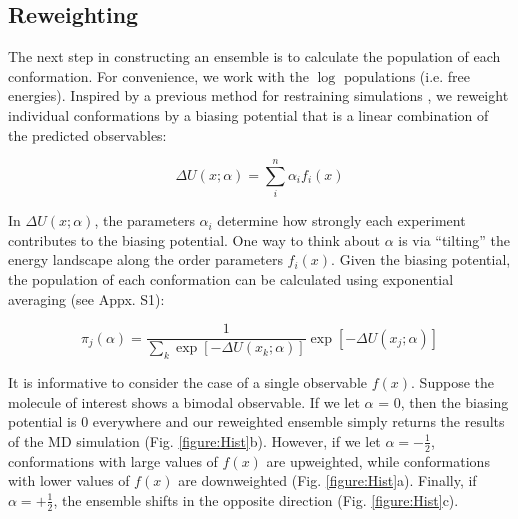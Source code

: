 \documentclass[journal=jacsat,manuscript=article]{achemso}
\begin{document}
\subsection{Reweighting}

The next step in constructing an ensemble is to calculate the population of each conformation.  For convenience, we work with the $\log$ populations (i.e. free energies). Inspired by a previous method for restraining simulations \cite{chodera2012}, we reweight individual conformations by a biasing potential that is a linear combination of the predicted observables:

$$\Delta U(x;\alpha) = \sum_i^n \alpha_i f_i(x)$$

In $\Delta U(x;\alpha)$, the parameters $\alpha_i$ determine how strongly each experiment contributes to the biasing potential.  One way to think about $\alpha$ is via ``tilting'' the energy landscape along the order parameters $f_i(x)$.  Given the biasing potential, the population of each conformation can be calculated using exponential averaging (see Appx. S1):

$$\pi_j(\alpha) = \frac{1}{\sum_k \exp[-\Delta U(x_k;\alpha)]} \exp[-\Delta U(x_j;\alpha)]$$

It is informative to consider the case of a single observable $f(x)$.  Suppose the molecule of interest shows a bimodal observable.  If we let $\alpha$ = 0, then the biasing potential is $0$ everywhere and our reweighted ensemble simply returns the results of the MD simulation (Fig. \ref{figure:Hist}b).  However, if we let $\alpha = -\frac{1}{2}$, conformations with large values of $f(x)$ are upweighted, while conformations with lower values of $f(x)$ are downweighted (Fig. \ref{figure:Hist}a).  Finally, if $\alpha = +\frac{1}{2}$, the ensemble shifts in the opposite direction (Fig. \ref{figure:Hist}c).  
\end{document}

